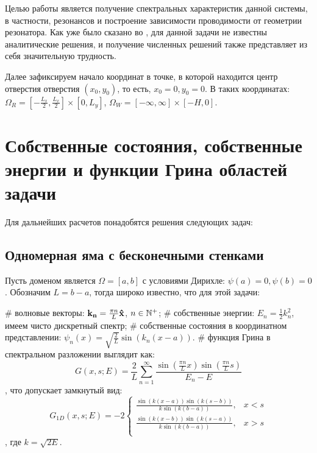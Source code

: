 Целью работы является получение спектральных характеристик данной системы, в частности, резонансов и построение зависимости проводимости от геометрии резонатора. Как уже было сказано во , для данной задачи не известны аналитические решения, и получение численных решений также представляет из себя значительную трудность.

Далее зафиксируем начало координат в точке, в которой находится центр отверстия отверстия $(x_0, y_0)$, то есть, $x_0 = 0, y_0 = 0$. В таких координатах: $\Omega_R = [- \frac{L_x}{2}, \frac{L_x}{2}] \times [0, L_y]$, $\Omega_W = [-\infty, \infty] \times [-H, 0]$.

\section{Собственные состояния, собственные энергии и функции Грина областей задачи}
Для дальнейших расчетов понадобятся решения следующих задач:

\subsection{Одномерная яма с бесконечными стенками}
Пусть доменом является $\Omega = [a, b]$ с условиями Дирихле: $\psi(a) = 0, \psi(b) = 0$. Обозначим $L = b - a$, тогда широко известно, что для этой задачи:
\begin{ilist}
# волновые векторы: $\vb{k_n} = \frac{\pi n}{L} \vb{\hat{x}}$, $n \in \mathbb{N}^+$;
# собственные энергии: $E_n = \frac{1}{2} k_n^2$, имеем чисто дискретный спектр;
# собственные состояния в координатном представлении: $\psi_n(x) = \sqrt{\frac{2}{L}} \sin(k_n (x - a))$.
# функция Грина в спектральном разложении выглядит как:
\[
G(x, s; E) = \frac{2}{L} \sum\limits_{n = 1}^\infty \frac{\sin(\frac{\pi n}{L} x) \sin(\frac{\pi n}{L} s)}{E_n - E}
\]
, что допускает замкнутый вид:
\[
G_{1D}(x, s; E) = - 2 \begin{cases}
\frac{\sin(k(x - a)) \sin(k(s - b))}{k \sin(k(b - a))}, & x < s \\
\frac{\sin(k(x - b)) \sin(k(s - a))}{k \sin(k(b - a))}, & x > s \\
\end{cases}
\]
, где $k = \sqrt{2 E}$.
\end{ilist}

